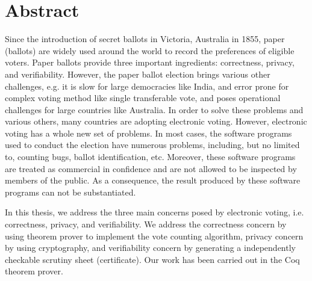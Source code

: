\chapter*{Abstract}
\setlength{\parindent}{2em}
\setlength{\parskip}{1em}



Since the introduction of secret ballots in Victoria, Australia in 1855, 
paper (ballots) are widely used around the world to record 
the preferences of eligible voters. Paper ballots provide three 
important ingredients: correctness, privacy, and verifiability. 
However, the paper ballot election brings various  other challenges, e.g. 
it is slow for large democracies like India,  and error prone for complex voting method 
like single transferable vote, and poses operational challenges for 
large countries like Australia. In order to solve these problems and various others, 
many countries are adopting electronic voting. However, 
electronic voting has a whole new set of problems. In most cases, the software 
programs used to conduct the election have numerous problems, including, but no limited to, 
counting bugs, ballot identification, etc. Moreover, 
these software programs are treated as commercial in confidence and 
are not allowed to be inspected by members of the public. 
As a consequence, the result produced by these software programs 
can not be substantiated.

In this thesis, we address the three main concerns posed by electronic voting, i.e. 
correctness, privacy, and verifiability. We address the correctness concern by using 
theorem prover to implement the vote counting algorithm, 
privacy concern by using  cryptography,  and verifiability concern 
by generating a independently checkable scrutiny sheet (certificate). Our work 
has been carried out in the Coq theorem prover.

